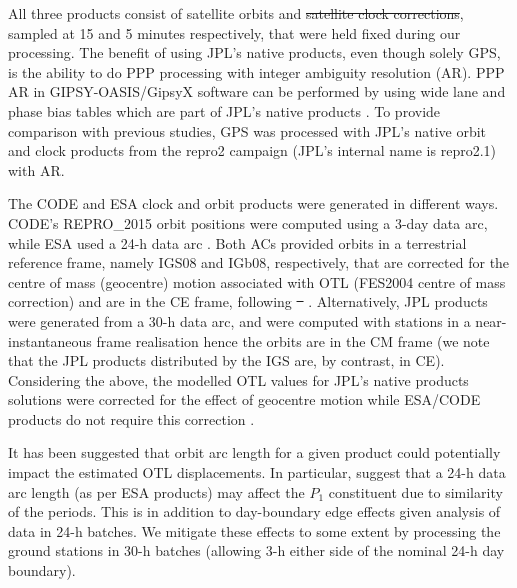 \documentclass[se, manuscript]{copernicus}
\providecommand{\DIFadd}[1]{{\protect\color{blue}\uwave{#1}}} %
\providecommand{\DIFdel}[1]{{\protect\color{red}\sout{#1}}}                      %
\providecommand{\DIFaddbegin}{} %
\providecommand{\DIFaddend}{} %
\providecommand{\DIFdelbegin}{} %
\providecommand{\DIFdelend}{} %
\begin{document}
All three products consist of satellite orbits and \DIFdelbegin \DIFdel{satellite clock corrections}\DIFdelend \DIFaddbegin \DIFadd{clocks}\DIFaddend , sampled at 15 and 5 minutes respectively, that were held fixed during our processing. The benefit of using JPL’s native products, even though solely GPS, is the ability to do PPP processing with integer ambiguity resolution (AR). PPP AR in GIPSY-OASIS/GipsyX software can be performed by using wide lane and phase bias tables which are part of JPL’s native products \citep{Bertiger2010}. To provide comparison with previous studies, GPS was processed with JPL’s native orbit and clock products from the repro2 campaign (JPL’s internal name is repro2.1) with AR.

The CODE and ESA clock and orbit products were generated in different ways. CODE’s REPRO\_2015 orbit positions were computed using a 3-day data arc, while ESA used a 24-h data arc \citep{Griffiths2019}. Both ACs provided orbits in a terrestrial reference frame, namely IGS08 and IGb08, respectively, that are corrected for the centre of mass (geocentre) motion associated with OTL (FES2004 centre of mass correction) and are in the CE frame, following \DIFdelbegin \DIFdel{\mbox{%
\cite{Blewitt2003}}\hspace{0pt}%
}\DIFdelend \DIFaddbegin \DIFadd{\mbox{%
\cite{fu_effect_2012}}\hspace{0pt}%
}\DIFaddend . Alternatively, JPL products were generated from a 30-h data arc, and were computed with stations in a near-instantaneous frame realisation hence the orbits are in the CM frame (we note that the JPL products distributed by the IGS are, by contrast, in CE). Considering the above, the modelled OTL values for JPL’s native products solutions were corrected for the effect of geocentre motion while ESA/CODE products do not require this correction \citep{Kouba2009}.

It has been suggested that orbit arc length for a given product could potentially impact the estimated OTL displacements. In particular, \cite{Ito2011} suggest that a 24-h data arc length (as per ESA products) may affect the $P_1$ constituent due to similarity of the periods. This is in addition to day-boundary edge effects given analysis of data in 24-h batches. We mitigate these effects to some extent by processing the ground stations in 30-h batches (allowing 3-h either side of the nominal 24-h day boundary).
\end{document}
